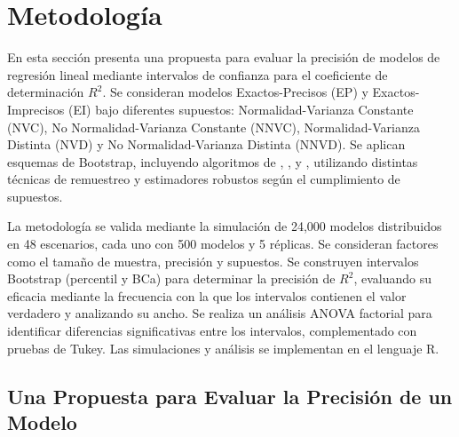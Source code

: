 \section{Metodología}
En esta sección presenta una propuesta para evaluar la precisión de modelos de regresión lineal mediante intervalos de confianza para el coeficiente de determinación \(R^2\). Se consideran modelos Exactos-Precisos (EP) y Exactos-Imprecisos (EI) bajo diferentes supuestos: Normalidad-Varianza Constante (NVC), No Normalidad-Varianza Constante (NNVC), Normalidad-Varianza Distinta (NVD) y No Normalidad-Varianza Distinta (NNVD). Se aplican esquemas de Bootstrap, incluyendo algoritmos de \textcite{wu-1986}, \textcite{liu-1988}, \textcite{zacarias-2023} y \textcite{balam-2012}, utilizando distintas técnicas de remuestreo y estimadores robustos según el cumplimiento de supuestos.

La metodología se valida mediante la simulación de 24,000 modelos distribuidos en 48 escenarios, cada uno con 500 modelos y 5 réplicas. Se consideran factores como el tamaño de muestra, precisión y supuestos. Se construyen intervalos Bootstrap (percentil y BCa) para determinar la precisión de \(R^2\), evaluando su eficacia mediante la frecuencia con la que los intervalos contienen el valor verdadero y analizando su ancho. Se realiza un análisis ANOVA factorial para identificar diferencias significativas entre los intervalos, complementado con pruebas de Tukey. Las simulaciones y análisis se implementan en el lenguaje R.


\subsection{Una Propuesta para Evaluar la Precisión de un Modelo}

